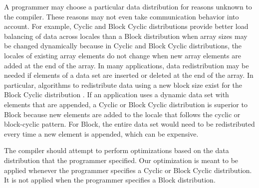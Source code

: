 A programmer may choose a particular data distribution for reasons unknown to the compiler. These reasons may not even take communication behavior into account. For example, Cyclic and Block Cyclic distributions provide better load balancing of data across locales than a Block distribution when array sizes may be changed dynamically because in Cyclic and Block Cyclic distributions, the locales of existing array elements do not change when new array elements are added at the end of the array. In many applications, data redistribution may be needed if elements of a data set are inserted or deleted at the end of the array. In particular, algorithms to redistribute data using a new block size exist for the Block Cyclic distribution \cite{prylli1997fast,walker1996redistribution}. If an application uses a dynamic data set with elements that are appended, a Cyclic or Block Cyclic distribution is superior to Block because new elements are added to the locale that follows the cyclic or block-cyclic pattern. For Block, the entire data set would need to be redistributed every time a new element is appended, which can be expensive. 

The compiler should attempt to perform optimizations based on the data distribution that the programmer specified. Our optimization is meant to be applied whenever the programmer specifies a Cyclic or Block Cyclic distribution. It is not applied when the programmer specifies a Block distribution.